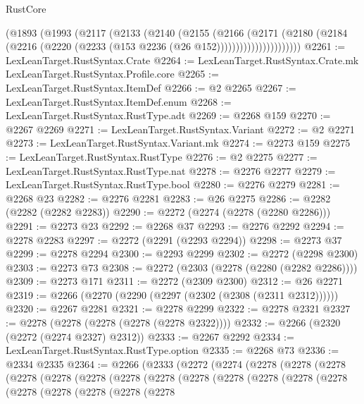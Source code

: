 \begin{lexlean}{RustCore}
\begin{coremodule}
                  (@1893
                    (@1993
                      (@2117
                        (@2133
                          (@2140
                            (@2155
                              (@2166
                                (@2171
                                  (@2180
                                    (@2184
                                      (@2216
                                        (@2220 (@2233 (@153 @2236 (@26 @152))))))))))))))))))))))
@2261 := LexLeanTarget.RustSyntax.Crate
@2264 := LexLeanTarget.RustSyntax.Crate.mk LexLeanTarget.RustSyntax.Profile.core
@2265 := LexLeanTarget.RustSyntax.ItemDef
@2266 := @2 @2265
@2267 := LexLeanTarget.RustSyntax.ItemDef.enum
@2268 := LexLeanTarget.RustSyntax.RustType.adt
@2269 := @2268 @159
@2270 := @2267 @2269
@2271 := LexLeanTarget.RustSyntax.Variant
@2272 := @2 @2271
@2273 := LexLeanTarget.RustSyntax.Variant.mk
@2274 := @2273 @159
@2275 := LexLeanTarget.RustSyntax.RustType
@2276 := @2 @2275
@2277 := LexLeanTarget.RustSyntax.RustType.nat
@2278 := @2276 @2277
@2279 := LexLeanTarget.RustSyntax.RustType.bool
@2280 := @2276 @2279
@2281 := @2268 @23
@2282 := @2276 @2281
@2283 := @26 @2275
@2286 := @2282 (@2282 (@2282 @2283))
@2290 := @2272 (@2274 (@2278 (@2280 @2286)))
@2291 := @2273 @23
@2292 := @2268 @37
@2293 := @2276 @2292
@2294 := @2278 @2283
@2297 := @2272 (@2291 (@2293 @2294))
@2298 := @2273 @37
@2299 := @2278 @2294
@2300 := @2293 @2299
@2302 := @2272 (@2298 @2300)
@2303 := @2273 @73
@2308 := @2272 (@2303 (@2278 (@2280 (@2282 @2286))))
@2309 := @2273 @171
@2311 := @2272 (@2309 @2300)
@2312 := @26 @2271
@2319 := @2266 (@2270 (@2290 (@2297 (@2302 (@2308 (@2311 @2312))))))
@2320 := @2267 @2281
@2321 := @2278 @2299
@2322 := @2278 @2321
@2327 := @2278 (@2278 (@2278 (@2278 (@2278 @2322))))
@2332 := @2266 (@2320 (@2272 (@2274 @2327) @2312))
@2333 := @2267 @2292
@2334 := LexLeanTarget.RustSyntax.RustType.option
@2335 := @2268 @73
@2336 := @2334 @2335
@2364 := @2266
    (@2333
      (@2272
        (@2274
          (@2278
            (@2278
              (@2278
                (@2278
                  (@2278
                    (@2278
                      (@2278
                        (@2278
                          (@2278
                            (@2278
                              (@2278
                                (@2278
                                  (@2278
                                    (@2278
                                      (@2278
                                        (@2278
                                          (@2278
                                            (@2278

\end{coremodule}
\end{lexlean}
